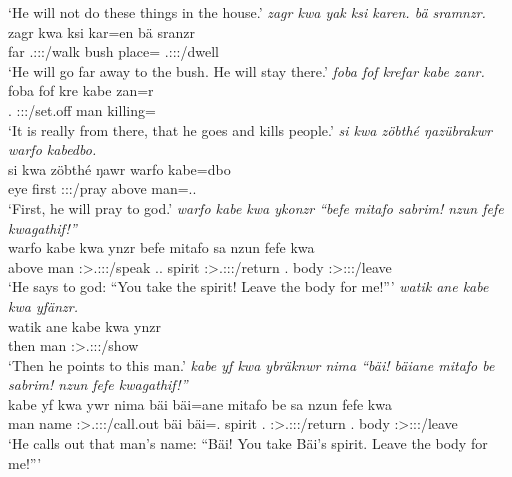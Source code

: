 \begin{exe}
	\trans `He will not do these things in the house.'
	\emph{zagr kwa yak ksi karen. bä sramnzr.}\\
	\gll zagr kwa  ksi kar=en bä sranzr\\
	far {\Fut} \Tsg.\Masc:\Sbj:\Nonpast:\Ipfv/walk bush place={\Loc} \Med{} \Tsg.\Masc:\Sbj:\Irr:\Ipfv/dwell\\
	\trans `He will go far away to the bush. He will stay there.'
	\emph{foba fof krefar kabe zanr.}\\
	\gll foba fof kre kabe zan=r\\
	\Dist.{\Abl} {\Emph} \Stsg:\Sbj:\Irr:\Pfv/set.off man killing=\Purp\\
	\trans `It is really from there, that he goes and kills people.'
	\emph{si kwa zöbthé ŋazübrakwr warfo kabedbo.}\\
	\gll si kwa zöbthé ŋawr warfo kabe=dbo\\
	eye {\Fut} first \Stsg:\Sbj:\Nonpast:\Ipfv/pray above man=\All.\Anim.\Sg\\
	\trans `First, he will pray to god.'
	\emph{warfo kabe kwa ykonzr ``befe mitafo sabrim! nzun fefe kwagathif!''}\\
	\gll warfo kabe kwa ynzr befe mitafo sa nzun fefe kwa\\
	above man {\Fut} \Stsg:\Sbj>\Tsg.\Masc:\Obj:\Nonpast:\Ipfv/speak \Ssg.\Erg.{\Emph} spirit \Stsg:\Sbj>\Tsg.\Masc:\Io:\Imp:\Pfv/return \Fsg.{\Dat} body \Stsg:\Sbj>\Fsg:\Io:\Imp:\Pfv/leave\\
	\trans `He says to god: ``You take the spirit! Leave the body for me!'''
	\emph{watik ane kabe kwa yfänzr.}\\
	\gll watik ane kabe kwa ynzr\\
	then {\Dem} man {\Fut} \Stsg:\Sbj>\Tsg.\Masc:\Obj:\Nonpast:\Ipfv/show\\
	\trans `Then he points to this man.'
	\emph{kabe yf kwa ybräknwr nima ``bäi! bäiane mitafo be sabrim! nzun fefe kwagathif!''}\\
	\gll kabe yf kwa ywr nima bäi bäi=ane mitafo be sa nzun fefe kwa\\
	man name {\Fut} \Stsg:\Sbj>\Tsg.\Masc:\Obj:\Nonpast:\Ipfv/call.out {\Quot} bäi bäi=\Poss.{\Sg} spirit \Ssg.{\Erg} \Stsg:\Sbj>\Tsg.\Masc:\Io:\Imp:\Pfv/return \Fsg.{\Dat} body \Stsg:\Sbj>\Fsg:\Io:\Imp:\Pfv/leave\\
	\trans `He calls out that man's name: ``Bäi! You take Bäi's spirit. Leave the body for me!'''

\end{exe}
